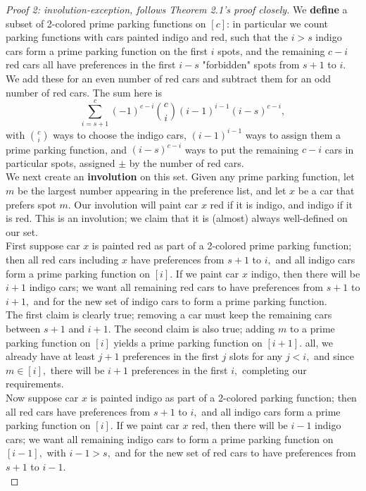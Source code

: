 \begin{proof}[Proof 2: involution-exception, follows Theorem 2.1's proof closely]
    We \textbf{define} a subset of 2-colored prime parking functions on $[c]$: in particular we count parking functions with cars painted indigo and red, such that the $i>s$ indigo cars form a prime parking function on the first $i$ spots, and the remaining $c-i$ red cars all have preferences in the first $i-s$ "forbidden" spots from $s+1$ to $i.$ We add these for an even number of red cars and subtract them for an odd number of red cars. The sum here is
	\[
		\sum_{i = s+1}^{c} (-1)^{c - i} \binom{c}{i} (i - 1)^{i - 1}(i - s)^{c - i},
	\] with $\binom{c}{i}$ ways to choose the indigo cars, $(i-1)^{i-1}$ ways to assign them a prime parking function, and $(i-s)^{c-i}$ ways to put the remaining $c-i$ cars in particular spots, assigned $\pm$ by the number of red cars.\\

    We next create an \textbf{involution} on this set. Given any prime parking function, let $m$ be the largest number appearing in the preference list, and let $x$ be a car that prefers spot $m.$ Our involution will paint car $x$ red if it is indigo, and indigo if it is red. This is an involution; we claim that it is (almost) always well-defined on our set.\\

    First suppose car $x$ is painted red as part of a 2-colored prime parking function; then all red cars including $x$ have preferences from $s+1$ to $i,$ and all indigo cars form a prime parking function on $[i].$ If we paint car $x$ indigo, then there will be $i+1$ indigo cars; we want all remaining red cars to have preferences from $s+1$ to $i+1,$ and for the new set of indigo cars to form a prime parking function.\\

    The first claim is clearly true; removing a car must keep the remaining cars between $s+1$ and $i+1.$ The second claim is also true; adding $m$ to a prime parking function on $[i]$ yields a prime parking function on $[i+1].$ all, we already have at least $j+1$ preferences in the first $j$ slots for any $j<i,$ and since $m\in[i],$ there will be $i+1$ preferences in the first $i,$ completing our requirements.\\

    Now suppose car $x$ is painted indigo as part of a 2-colored parking function; then all red cars have preferences from $s+1$ to $i,$ and all indigo cars form a prime parking function on $[i].$ If we paint car $x$ red, then there will be $i-1$ indigo cars; we want all remaining indigo cars to form a prime parking function on $[i-1],$ with $i-1>s,$ and for the new set of red cars to have preferences from $s+1$ to $i-1.$\\
    

\end{proof}

